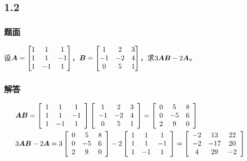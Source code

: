 \documentclass[9pt,xcolor=svgnames]{beamer} %
\begin{document}
\subsection*{1.2}
\begin{frame}
    \frametitle{题面}
    设\(\boldsymbol{A}=\begin{bmatrix}
        1 & 1  & 1  \\
        1 & 1  & -1 \\
        1 & -1 & 1
    \end{bmatrix}\)，\(\boldsymbol{B}=\begin{bmatrix}
        1  & 2  & 3 \\
        -1 & -2 & 4 \\
        0  & 5  & 1
    \end{bmatrix}\)，求\(3\boldsymbol{A}\boldsymbol{B}-2\boldsymbol{A}\)。
\end{frame}
\begin{frame}
    \frametitle{解答}
    \begin{align*}
         & \boldsymbol{A}\boldsymbol{B}           =
        \left[\begin{array}{ccc}
                      1 & 1  & 1  \\
                      1 & 1  & -1 \\
                      1 & -1 & 1
                  \end{array}\right]
        \left[\begin{array}{ccc}
                      1  & 2  & 3 \\
                      -1 & -2 & 4 \\
                      0  & 5  & 1
                  \end{array}\right]=
        \left[\begin{array}{ccc}
                      0 & 5  & 8 \\
                      0 & -5 & 6 \\
                      2 & 9  & 0
                  \end{array}\right]  \\
         & 3\boldsymbol{A}\boldsymbol{B}-2 \boldsymbol{A}  =
        3\left[\begin{array}{ccc}
                       0 & 5  & 8 \\
                       0 & -5 & 6 \\
                       2 & 9  & 0
                   \end{array}\right]
        -2\left[\begin{array}{ccc}
                        1 & 1  & 1  \\
                        1 & 1  & -1 \\
                        1 & -1 & 1
                    \end{array}\right]
        =\left[\begin{array}{ccc}
                       -2 & 13  & 22 \\
                       -2 & -17 & 20 \\
                       4  & 29  & -2
                   \end{array}\right]
    \end{align*}
\end{frame}
\end{document}
